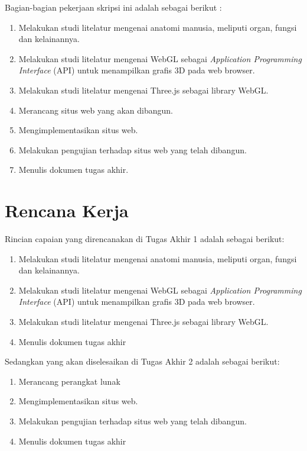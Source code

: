 \documentclass[a4paper,twoside]{article}
\begin{document}
	
	Bagian-bagian pekerjaan skripsi ini adalah sebagai berikut :
	\begin{enumerate}
		\item Melakukan studi litelatur mengenai anatomi manusia, meliputi organ, fungsi dan kelainannya.
        \item Melakukan studi litelatur mengenai WebGL sebagai \textit{Application Programming Interface} (API) untuk menampilkan grafis 3D pada web browser.
        \item Melakukan studi litelatur mengenai Three.js sebagai library WebGL.
        \item Merancang situs web yang akan dibangun.
        \item Mengimplementasikan situs web.
        \item Melakukan pengujian terhadap situs web yang telah dibangun.
		\item Menulis dokumen tugas akhir.
	\end{enumerate}
	
	\section{Rencana Kerja}
	Rincian capaian yang direncanakan di Tugas Akhir 1 adalah sebagai berikut:
	\begin{enumerate}
		\item Melakukan studi litelatur mengenai anatomi manusia, meliputi organ, fungsi dan kelainannya.
         \item Melakukan studi litelatur mengenai WebGL sebagai \textit{Application Programming Interface} (API) untuk menampilkan grafis 3D pada web browser.
		\item Melakukan studi litelatur mengenai Three.js sebagai library WebGL.
		\item Menulis dokumen tugas akhir
	\end{enumerate}
	
	Sedangkan yang akan diselesaikan di Tugas Akhir 2 adalah sebagai berikut:
	\begin{enumerate}
        \item Merancang perangkat lunak
        \item Mengimplementasikan situs web.
        \item  Melakukan pengujian terhadap situs web yang telah dibangun.
		\item Menulis dokumen tugas akhir
	\end{enumerate}
    
\end{document}
